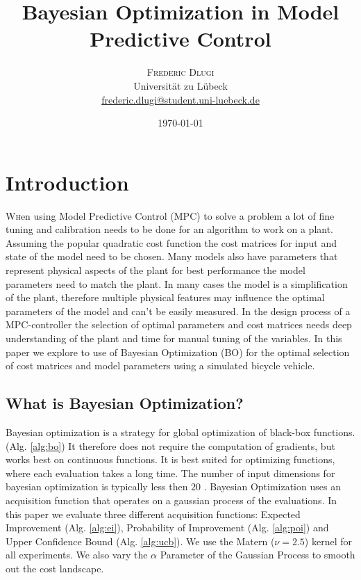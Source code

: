 \documentclass[twoside,twocolumn]{article}
\title{Bayesian Optimization in Model Predictive Control} %
\author{%
\textsc{Frederic Dlugi}\\[1ex] %
\normalsize Universität zu Lübeck \\ %
\normalsize \href{mailto:frederic.dlugi@student.uni-luebeck.de}{frederic.dlugi@student.uni-luebeck.de} %
}
\date{\today} %
\begin{document}
\maketitle


\section{Introduction}

\lettrine[nindent=0em,lines=3]{W}  hen using Model Predictive Control (MPC) to solve a problem a lot of fine tuning and calibration needs to be done for an algorithm to work on a plant. Assuming the popular quadratic cost function the cost matrices for input and state of the model need to be chosen. Many models also have parameters that represent physical aspects of the plant for best performance the model parameters need to match the plant. In many cases the model is a simplification of the plant, therefore multiple physical features may influence the optimal parameters of the model and can't be easily measured. In the design process of a MPC-controller the selection of optimal parameters and cost matrices needs deep understanding of the plant and time for manual tuning of the variables. In this paper we explore to use of Bayesian Optimization (BO) for the optimal selection of cost matrices and model parameters using a simulated bicycle vehicle.

\subsection{What is Bayesian Optimization?}
Bayesian optimization is a strategy for global optimization of black-box functions. (Alg. \ref{alg:bo})
It therefore does not require the computation of gradients, but works best on continuous functions.
It is best suited for optimizing functions, where each evaluation takes a long time.
The number of input dimensions for bayesian optimization is typically less then $20$ \cite{frazier2018tutorial}.
Bayesian Optimization uses an acquisition function that operates on a gaussian process of the evaluations. In this paper we evaluate three different acquisition functions: Expected Improvement (Alg. \ref{alg:ei}), Probability of Improvement (Alg. \ref{alg:poi}) and Upper Confidence Bound (Alg. \ref{alg:ucb}). We use the Matern ($\nu=2.5$) kernel for all experiments. We also vary the $\alpha$ Parameter of the Gaussian Process to smooth out the cost landscape.
\end{document}
